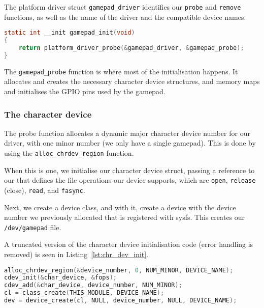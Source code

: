 The platform driver struct \texttt{gamepad\_driver} identifies our \texttt{probe} and \texttt{remove} functions, as well as the name of the driver and the compatible device names.

\begin{minipage}{\textwidth}
\begin{lstlisting}[language=c, label=lst:gamepad_init, caption=The module's initialisation function.]
static int __init gamepad_init(void)
{
    return platform_driver_probe(&gamepad_driver, &gamepad_probe);
}
\end{lstlisting}
\end{minipage}

The \texttt{gamepad\_probe} function is where most of the initialisation happens. It allocates and creates the necessary character device structures, and memory maps and initialises the GPIO pins used by the gamepad.

\subsubsection{The character device}
The probe function allocates a dynamic major character device number for our driver, with one minor number (we only have a single gamepad). This is done by using the \texttt{alloc\_chrdev\_region} function.

When this is one, we initialise our character device struct, passing a reference to our  that defines the file operations our device supports, which are \texttt{open}, \texttt{release} (close), \texttt{read}, and \texttt{fasync}.

Next, we create a device class, and with it, create a device with the device number we previously allocated that is registered with sysfs. This creates our \texttt{/dev/gamepad} file.

A truncated version of the character device initialisation code (error handling is removed) is seen in Listing~\ref{lst:chr_dev_init}.

\begin{minipage}{\linewidth}
\begin{lstlisting}[language=c, label=lst:chr_dev_init, caption=Character device initialisation code from the driver's probe function with error handling removed.]
alloc_chrdev_region(&device_number, 0, NUM_MINOR, DEVICE_NAME);
cdev_init(&char_device, &fops);
cdev_add(&char_device, device_number, NUM_MINOR);
cl = class_create(THIS_MODULE, DEVICE_NAME);
dev = device_create(cl, NULL, device_number, NULL, DEVICE_NAME);
\end{lstlisting}
\end{minipage}

